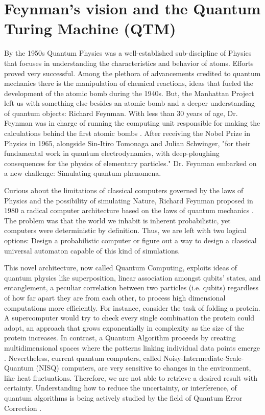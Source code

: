 \section{Feynman's vision and the Quantum Turing Machine (QTM)}

By the 1950s Quantum Physics was a well-established sub-discipline of Physics that focuses in understanding the characteristics and behavior of atoms. Efforts proved very successful. Among the plethora of advancements credited to quantum mechanics there is the manipulation of chemical reactions, ideas that fueled the development of the atomic bomb during the 1940s. But, the Manhattan Project left us with something else besides an atomic bomb and a deeper understanding of quantum objects: Richard Feynman. With less than 30 years of age, Dr. Feynman was in charge of running the computing unit responsible for making the calculations behind the first atomic bombs \cite{selwood_richard_2018}. After receiving the Nobel Prize in Physics in 1965, alongside Sin-Itiro Tomonaga and Julian Schwinger, "for their fundamental work in quantum electrodynamics, with deep-ploughing consequences for the physics of elementary particles." \cite{nobel_physics} Dr. Feynman embarked on a new challenge: Simulating quantum phenomena. 

Curious about the limitations of classical computers governed by the laws of Physics and the possibility of simulating Nature, Richard Feynman proposed in 1980 a radical computer architecture based on the laws of quantum mechanics \cite{feynman_simulating_1981}. The problem was that the world we inhabit is inherent probabilistic, yet computers were deterministic by definition. Thus, we are left with two logical options: Design a probabilistic computer or figure out a way to design a classical universal automaton capable of this kind of simulations. 

This novel architecture, now called Quantum Computing, exploits ideas of quantum physics like superposition, linear association amongst qubits' states, and entanglement, a peculiar correlation between two particles (i.e. qubits) regardless of how far apart they are from each other, to process high dimensional computations more efficiently. For instance, consider the task of folding a protein. A supercomputer would try to check every single combination the protein could adopt, an approach that grows exponentially in complexity as the size of the protein increases. In contrast, a Quantum Algorithm proceeds by creating multidimensional spaces where the patterns linking individual data points emerge \cite{ibm_quantum}. Nevertheless, current quantum computers, called Noisy-Intermediate-Scale-Quantum (NISQ) computers, are very sensitive to changes in the environment, like heat fluctuations. Therefore, we are not able to retrieve a desired result with certainty. Understanding how to reduce the uncertainty, or interference, of quantum algorithms is being actively studied by the field of Quantum Error Correction \cite{somoroff_quantum_2018}.

